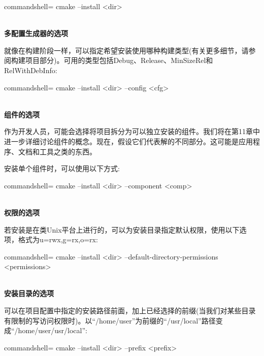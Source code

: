 \begin{tcblisting}{commandshell={}}
cmake --install <dir>
\end{tcblisting}

\hspace*{\fill} \\ %
\noindent
\textbf{多配置生成器的选项}

就像在构建阶段一样，可以指定希望安装使用哪种构建类型(有关更多细节，请参阅构建项目部分)。可用的类型包括Debug、Release、MinSizeRel和RelWithDebInfo:

\begin{tcblisting}{commandshell={}}
cmake --install <dir> --config <cfg>
\end{tcblisting}

\hspace*{\fill} \\ %
\noindent
\textbf{组件的选项}

作为开发人员，可能会选择将项目拆分为可以独立安装的组件。我们将在第11章中进一步详细讨论组件的概念。现在，假设它们代表解的不同部分。这可能是应用程序、文档和工具之类的东西。

安装单个组件时，可以使用以下方式:

\begin{tcblisting}{commandshell={}}
cmake --install <dir> --component <comp>
\end{tcblisting}

\hspace*{\fill} \\ %
\noindent
\textbf{权限的选项}

若安装是在类Unix平台上进行的，可以为安装目录指定默认权限，使用以下选项，格式为u=rwx,g=rx,o=rx:

\begin{tcblisting}{commandshell={}}
cmake --install <dir>
  --default-directory-permissions <permissions>
\end{tcblisting}

\hspace*{\fill} \\ %
\noindent
\textbf{安装目录的选项}

可以在项目配置中指定的安装路径前面，加上已经选择的前缀(当我们对某些目录有限制的写访问权限时)。以“/home/user”为前缀的“/usr/local”路径变成“/home/user/usr/local”:

\begin{tcblisting}{commandshell={}}
cmake --install <dir> --prefix <prefix>
\end{tcblisting}

